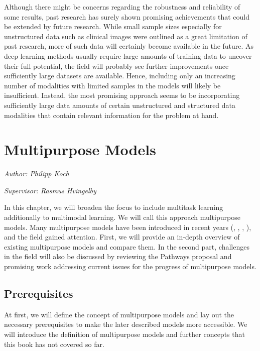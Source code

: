 \documentclass[
]{krantz}
\begin{document}
Although there might be concerns regarding the robustness and reliability of some results, past research has surely shown promising achievements that could be extended by future research. While small sample sizes especially for unstructured data such as clinical images were outlined as a great limitation of past research, more of such data will certainly become available in the future. As deep learning methods usually require large amounts of training data to uncover their full potential, the field will probably see further improvements once sufficiently large datasets are available. Hence, including only an increasing number of modalities with limited samples in the models will likely be insufficient. Instead, the most promising approach seems to be incorporating sufficiently large data amounts of certain unstructured and structured data modalities that contain relevant information for the problem at hand.

\hypertarget{c03-03-multi-purpose}{%
\section{Multipurpose Models}\label{c03-03-multi-purpose}}

\emph{Author: Philipp Koch}

\emph{Supervisor: Rasmus Hvingelby}

In this chapter, we will broaden the focus to include multitask learning additionally to multimodal learning. We will call this approach multipurpose models.
Many multipurpose models have been introduced in recent years (\citet{Kaiser2017}, \citet{Hu2021}, \citet{Wang2022}, \citet{Reed2022}), and the field gained attention.
First, we will provide an in-depth overview of existing multipurpose models and compare them. In the second part, challenges in the field will also be
discussed by reviewing the Pathways proposal \citep{Dean21} and promising work addressing current issues for the progress of multipurpose models.

\hypertarget{prerequisites}{%
\subsection{Prerequisites}\label{prerequisites}}

At first, we will define the concept of multipurpose models and lay out the necessary prerequisites to make the later described models more accessible.
We will introduce the definition of multipurpose models and further concepts that this book has not covered so far.
\end{document}
